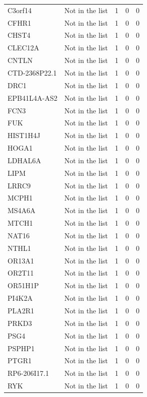 \documentclass[12pt,twoside]{reedthesis}
\theoremstyle{definition}
\theoremstyle{definition}
\theoremstyle{remark}
\begin{document}
\begin{longtable}[t]{llrrr}
  C3orf14 & Not in the list & 1 & 0 & 0\\
  \addlinespace
  CFHR1 & Not in the list & 1 & 0 & 0\\
  CHST4 & Not in the list & 1 & 0 & 0\\
  CLEC12A & Not in the list & 1 & 0 & 0\\
  CNTLN & Not in the list & 1 & 0 & 0\\
  CTD-2368P22.1 & Not in the list & 1 & 0 & 0\\
  \addlinespace
  DRC1 & Not in the list & 1 & 0 & 0\\
  EPB41L4A-AS2 & Not in the list & 1 & 0 & 0\\
  FCN3 & Not in the list & 1 & 0 & 0\\
  FUK & Not in the list & 1 & 0 & 0\\
  HIST1H4J & Not in the list & 1 & 0 & 0\\
  \addlinespace
  HOGA1 & Not in the list & 1 & 0 & 0\\
  LDHAL6A & Not in the list & 1 & 0 & 0\\
  LIPM & Not in the list & 1 & 0 & 0\\
  LRRC9 & Not in the list & 1 & 0 & 0\\
  MCPH1 & Not in the list & 1 & 0 & 0\\
  \addlinespace
  MS4A6A & Not in the list & 1 & 0 & 0\\
  MTCH1 & Not in the list & 1 & 0 & 0\\
  NAT16 & Not in the list & 1 & 0 & 0\\
  NTHL1 & Not in the list & 1 & 0 & 0\\
  OR13A1 & Not in the list & 1 & 0 & 0\\
  \addlinespace
  OR2T11 & Not in the list & 1 & 0 & 0\\
  OR51H1P & Not in the list & 1 & 0 & 0\\
  PI4K2A & Not in the list & 1 & 0 & 0\\
  PLA2R1 & Not in the list & 1 & 0 & 0\\
  PRKD3 & Not in the list & 1 & 0 & 0\\
  \addlinespace
  PSG4 & Not in the list & 1 & 0 & 0\\
  PSPHP1 & Not in the list & 1 & 0 & 0\\
  PTGR1 & Not in the list & 1 & 0 & 0\\
  RP6-206I17.1 & Not in the list & 1 & 0 & 0\\
  RYK & Not in the list & 1 & 0 & 0\\

\end{longtable}
\end{document}
